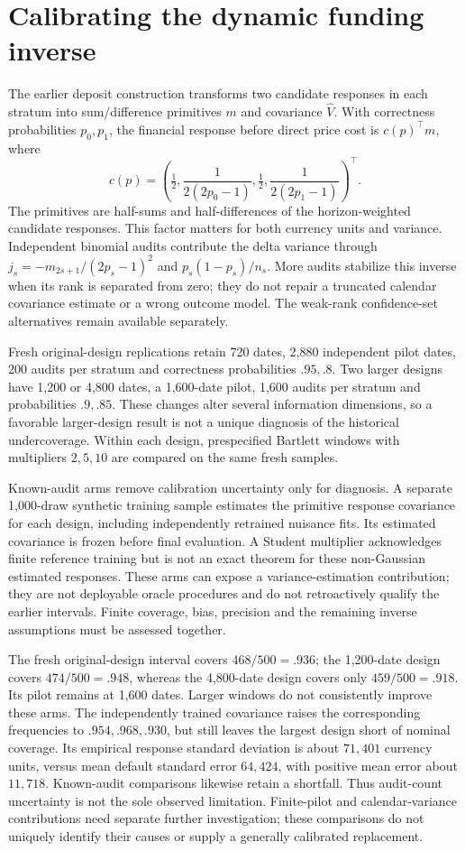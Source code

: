 \section{Calibrating the dynamic funding inverse}
\label{r8:calibration}

The earlier deposit construction transforms two candidate responses in each
stratum into sum/difference primitives $m$ and covariance $\widehat V$.
With correctness probabilities $p_0,p_1$, the financial response before direct
price cost is $c(p)^\top m$, where
\[
 c(p)=\left(\tfrac12,\frac1{2(2p_0-1)},
                  \tfrac12,\frac1{2(2p_1-1)}\right)^\top.
\]
The primitives are half-sums and half-differences of the horizon-weighted
candidate responses. This factor matters for both currency units and variance.
Independent binomial audits contribute the delta variance through
$j_s=-m_{2s+1}/(2p_s-1)^2$ and $p_s(1-p_s)/n_s$.
More audits stabilize this inverse when its rank is separated from zero;
they do not repair a truncated calendar covariance estimate or a wrong outcome
model. The weak-rank confidence-set alternatives remain available separately.

Fresh original-design replications retain 720 dates, 2,880 independent pilot
dates, 200 audits per stratum and correctness probabilities $.95,.8$.
Two larger designs have 1,200 or 4,800 dates, a 1,600-date pilot, 1,600 audits per
stratum and probabilities $.9,.85$. These changes alter several information
dimensions, so a favorable larger-design result is not a unique diagnosis of
the historical undercoverage. Within each design, prespecified Bartlett windows
with multipliers $2,5,10$ are compared on the same fresh samples.

Known-audit arms remove calibration uncertainty only for diagnosis. A separate
1,000-draw synthetic training sample estimates the primitive response covariance
for each design, including independently retrained nuisance fits. Its estimated
covariance is frozen before final evaluation. A Student multiplier acknowledges
finite reference training but is not an exact theorem for these non-Gaussian
estimated responses. These arms can expose a variance-estimation contribution;
they are not deployable oracle procedures and do not retroactively qualify the
earlier intervals. Finite coverage, bias, precision and the remaining inverse
assumptions must be assessed together.

The fresh original-design interval covers $468/500=.936$; the 1,200-date
design covers $474/500=.948$, whereas the 4,800-date design covers only
$459/500=.918$. Its pilot remains at 1,600 dates. Larger windows do not
consistently improve these arms. The independently trained covariance raises
the corresponding frequencies to $.954,.968,.930$, but still leaves the
largest design short of nominal coverage. Its empirical response standard
deviation is about $71,401$ currency units, versus mean default standard error
$64,424$, with positive mean error about $11,718$. Known-audit comparisons
likewise retain a shortfall. Thus audit-count uncertainty is not the sole
observed limitation. Finite-pilot and calendar-variance contributions need
separate further investigation; these comparisons do not uniquely identify
their causes or supply a generally calibrated replacement.

